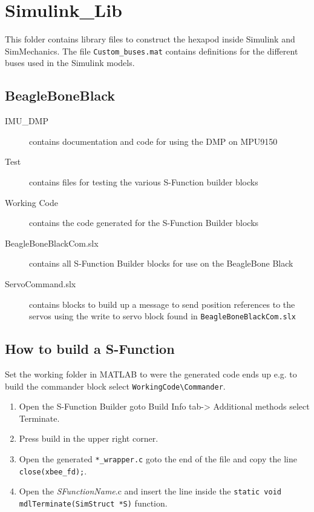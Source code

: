 \documentclass[letterpaper, 10 pt]{report}
\begin{document}
\newpage
\section{Simulink{\_}Lib}
This folder contains library files to construct the hexapod inside Simulink and SimMechanics. 
The file \texttt{Custom{\_}buses.mat} contains definitions for the different buses used in the Simulink models.
\subsection{BeagleBoneBlack}
\begin{description}
\item[IMU{\_}DMP] contains documentation and code for using the DMP on MPU9150
\item[Test] contains files for testing the various S-Function builder blocks
\item[Working Code] contains the code generated for the S-Function Builder blocks 
\item[BeagleBoneBlackCom.slx] contains all S-Function Builder blocks for use on the BeagleBone Black
\item[ServoCommand.slx] contains blocks to build up a message to send position references to the servos using the write to servo block found in \texttt{BeagleBoneBlackCom.slx}
\end{description}


\subsection{How to build a S-Function}
Set the working folder in MATLAB to were the generated code ends up e.g. to build the commander block select \texttt{WorkingCode\textbackslash Commander}.

\begin{enumerate}
\item Open the S-Function Builder goto Build Info tab-> Additional methods select Terminate.
\item Press build in the upper right corner.
\item Open the generated \texttt{*{\_}wrapper.c} goto the end of the file and copy the line \texttt{close(xbee{\_}fd);}.
\item Open the \textit{SFunctionName}.c and insert the line inside the 
\texttt{static void mdlTerminate(SimStruct *S)} function.
\end{enumerate}
\end{document}
